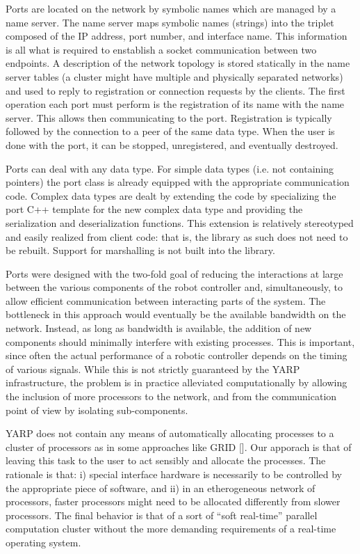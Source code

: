 Ports are located on the network by symbolic names which are managed by a name server.
%
%
The name server maps symbolic names (strings) into the triplet 
composed of the IP address, port number, and interface name. This information is all 
what is required to enstablish a socket communication between two endpoints. 
A description of the network topology is stored statically in the name server tables (a
cluster might have multiple and physically separated networks) and used to reply to
registration or connection requests by the clients. The first operation each port must
perform is the registration of its name with the name server. This allows then
communicating to the port. Registration is typically followed by the connection to a peer
of the same data type. When the user is done with the port, it can be stopped,
unregistered, and eventually destroyed.

Ports can deal with any data type. For simple data types (i.e. not containing pointers) 
the port class is already equipped with the appropriate communication code. Complex data
types are dealt by extending the code by specializing the port C++ template for the 
new complex data type and providing the serialization and deserialization functions. 
This extension is relatively stereotyped and easily realized from client code: that is, 
the library as such does not need to be rebuilt.
Support for marshalling is not built into the library.

Ports were designed with the two-fold goal of reducing the interactions at large between 
the various components of the robot controller and, simultaneously, to allow efficient 
communication between interacting parts of the system. The bottleneck in this approach
would eventually be the available bandwidth on the network. Instead, as long as bandwidth
is available, the addition of new components should minimally interfere with existing 
processes. This is important, since often the actual performance of a robotic controller
depends on the timing of various signals. While this is not strictly guaranteed by the 
YARP infrastructure, the problem is in practice alleviated computationally by allowing 
the inclusion of more processors to the network, and from the communication point of view
by isolating sub-components.

YARP does not contain any means of automatically allocating processes to a cluster of
processors as in some approaches like GRID []. Our apporach is that of leaving this
task to the user to act sensibly and allocate the processes. The rationale is that: i)
special interface hardware is necessarily to be controlled by the appropriate piece of 
software, and ii) in an etherogeneous network of processors, faster processors might 
need to be allocated differently from slower processors. The final behavior is that of 
a sort of ``soft real-time'' parallel computation cluster without the more demanding
requirements of a real-time operating system.


